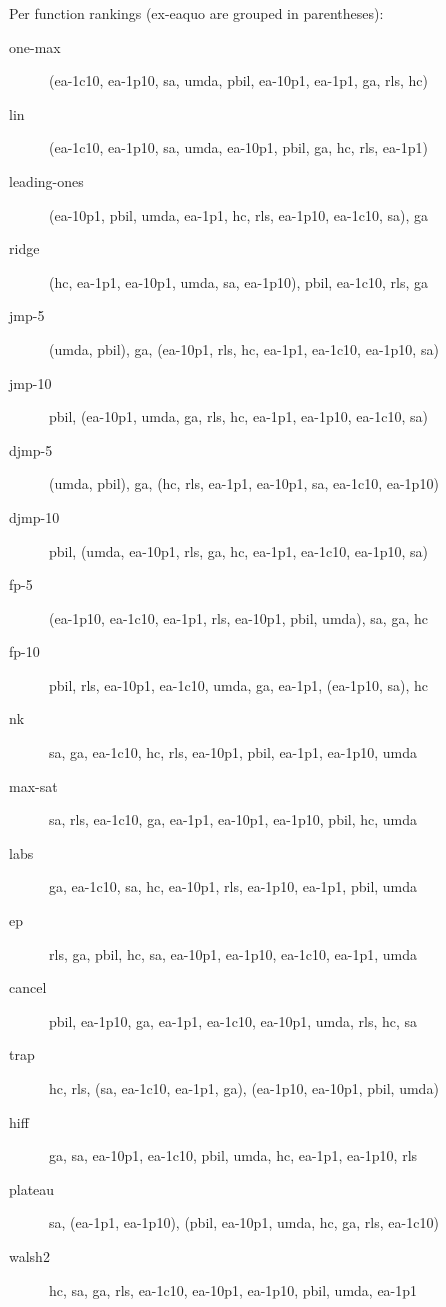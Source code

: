 Per function rankings (ex-eaquo are grouped in parentheses):
\begin{description}
\item[one-max]
(ea-1c10, ea-1p10, sa, umda, pbil, ea-10p1, ea-1p1, ga, rls, hc)

\item[lin]
(ea-1c10, ea-1p10, sa, umda, ea-10p1, pbil, ga, hc, rls, ea-1p1)

\item[leading-ones]
(ea-10p1, pbil, umda, ea-1p1, hc, rls, ea-1p10, ea-1c10, sa), ga

\item[ridge]
(hc, ea-1p1, ea-10p1, umda, sa, ea-1p10), pbil, ea-1c10, rls, ga

\item[jmp-5]
(umda, pbil), ga, (ea-10p1, rls, hc, ea-1p1, ea-1c10, ea-1p10, sa)

\item[jmp-10]
pbil, (ea-10p1, umda, ga, rls, hc, ea-1p1, ea-1p10, ea-1c10, sa)

\item[djmp-5]
(umda, pbil), ga, (hc, rls, ea-1p1, ea-10p1, sa, ea-1c10, ea-1p10)

\item[djmp-10]
pbil, (umda, ea-10p1, rls, ga, hc, ea-1p1, ea-1c10, ea-1p10, sa)

\item[fp-5]
(ea-1p10, ea-1c10, ea-1p1, rls, ea-10p1, pbil, umda), sa, ga, hc

\item[fp-10]
pbil, rls, ea-10p1, ea-1c10, umda, ga, ea-1p1, (ea-1p10, sa), hc

\item[nk]
sa, ga, ea-1c10, hc, rls, ea-10p1, pbil, ea-1p1, ea-1p10, umda

\item[max-sat]
sa, rls, ea-1c10, ga, ea-1p1, ea-10p1, ea-1p10, pbil, hc, umda

\item[labs]
ga, ea-1c10, sa, hc, ea-10p1, rls, ea-1p10, ea-1p1, pbil, umda

\item[ep]
rls, ga, pbil, hc, sa, ea-10p1, ea-1p10, ea-1c10, ea-1p1, umda

\item[cancel]
pbil, ea-1p10, ga, ea-1p1, ea-1c10, ea-10p1, umda, rls, hc, sa

\item[trap]
hc, rls, (sa, ea-1c10, ea-1p1, ga), (ea-1p10, ea-10p1, pbil, umda)

\item[hiff]
ga, sa, ea-10p1, ea-1c10, pbil, umda, hc, ea-1p1, ea-1p10, rls

\item[plateau]
sa, (ea-1p1, ea-1p10), (pbil, ea-10p1, umda, hc, ga, rls, ea-1c10)

\item[walsh2]
hc, sa, ga, rls, ea-1c10, ea-10p1, ea-1p10, pbil, umda, ea-1p1

\end{description}
